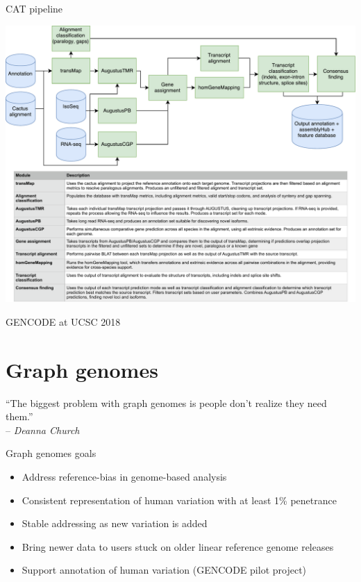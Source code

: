 \documentclass[10pt,
               hyperref={bookmarks=false,
                         bookmarksopen=false,
                         colorlinks=true,
                         linkcolor=blue,
                         urlcolor=blue},
               xcolor={svgnames,table}]{beamer}
\newcommand{\thetitle}{GENCODE at UCSC 2018}
\begin{document}
\begin{frame}{CAT pipeline}
  \begin{center}
    \includegraphics[scale=0.38]{images/CAT_pipeline.pdf}
  \end{center}
\end{frame}

\begin{frame}{\thetitle}
  \section{Graph genomes}
  {\large
  ``The biggest problem with graph genomes is people don't realize they need them.'' \\
  -- \textit{Deanna Church}}
\end{frame}

\begin{frame}{Graph genomes goals}
  \begin{itemize}
  \item Address reference-bias in genome-based analysis
  \item Consistent representation of human variation with at least 1\% penetrance
  \item Stable addressing as new variation is added
  \item Bring newer data to users stuck on older linear reference genome releases
  \item Support annotation of human variation (GENCODE pilot project)
  \end{itemize}
\end{frame}
\end{document}
